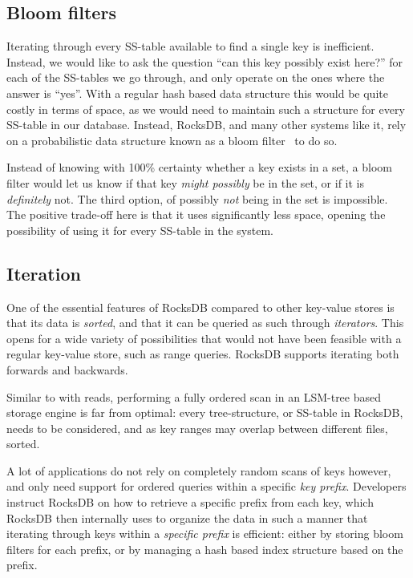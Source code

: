 \subsection{Bloom filters}
Iterating through every SS-table available to find a single key is inefficient.
Instead, we would like to ask the question ``can this key possibly exist here?''
for each of the SS-tables we go through, and only operate on the ones where the
answer is ``yes''. With a regular hash based data structure this would be quite
costly in terms of space, as we would need to maintain such a structure for
every SS-table in our database. Instead, RocksDB, and many other systems like
it, rely on a probabilistic data structure known as a bloom filter~\cite{bloom}
to do so.

Instead of knowing with 100\% certainty whether a key exists in a set, a bloom
filter would let us know if that key \textit{might possibly} be in the set, or
if it is \textit{definitely} not. The third option, of possibly \textit{not}
being in the set is impossible. The positive trade-off here is that it uses
significantly less space, opening the possibility of using it for every SS-table
in the system.

\subsection{Iteration}
One of the essential features of RocksDB compared to other key-value stores is
that its data is \textit{sorted}, and that it can be queried as such through
\textit{iterators}. This opens for a wide variety of possibilities that would
not have been feasible with a regular key-value store, such as range queries.
RocksDB supports iterating both forwards and backwards.

Similar to with reads, performing a fully ordered scan in an LSM-tree based
storage engine is far from optimal: every tree-structure, or SS-table in
RocksDB, needs to be considered, and as key ranges may overlap between different
files, sorted.

A lot of applications do not rely on completely random scans of keys however,
and only need support for ordered queries within a specific \textit{key prefix}.
Developers instruct RocksDB on how to retrieve a specific prefix from each key,
which RocksDB then internally uses to organize the data in such a manner that
iterating through keys within a \textit{specific prefix} is efficient: either by
storing bloom filters for each prefix, or by managing a hash based index
structure based on the prefix.

